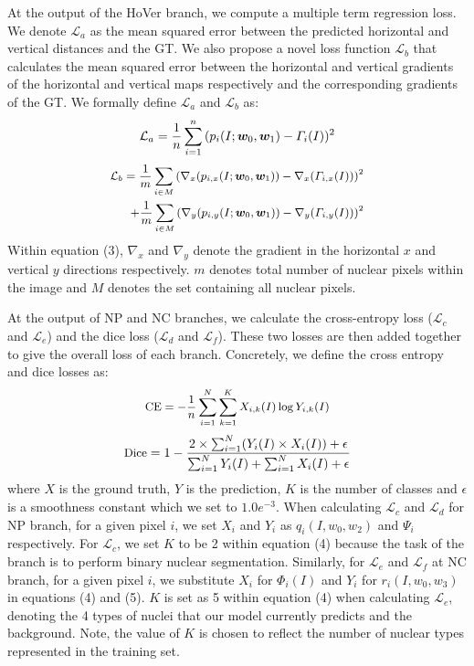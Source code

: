\documentclass[journal]{IEEEtran}
\begin{document}
	At the output of the HoVer branch, we compute a multiple term regression loss. We denote $\mathcal{L}_a$ as the mean squared error between the predicted horizontal and vertical distances and the GT. We also propose a novel loss function $\mathcal{L}_b$ that calculates the mean squared error between the horizontal and vertical gradients of the horizontal and vertical maps respectively and the corresponding gradients of the GT. We formally define $\mathcal{L}_a$ and $\mathcal{L}_b$ as:
	\begin{equation}
	\small
	\mathcal{L}_a = \frac{1}{n}\sum_{i = 1}^n{(p_i(I;\mathbold{w}_0,\mathbold{w}_1)- \Gamma _i(I))^2} 
	\end{equation}
	\begin{equation}
	\small
	\begin{split}
	\mathcal{L}_b =
	\frac{1}{m}\sum_{i \in M}{(\nabla_x(p_{i,x}(I;\mathbold{w}_0,\mathbold{w}_1))-\nabla_x( \Gamma _{i,x}(I)))^2} 
	\\ +
	\frac{1}{m}\sum_{i \in M}{(\nabla_y(p_{i,y}(I;\mathbold{w}_0, \mathbold{w}_1))-\nabla_y( \Gamma _{i,y}(I)))^2}
	\end{split}
	\end{equation}
	\noindent Within equation (3), $\nabla_x$ and $\nabla_y$ denote the gradient in the horizontal $x$ and vertical $y$ directions respectively. $m$ denotes total number of nuclear pixels within the image and $M$ denotes the set containing all nuclear pixels.
	
	At the output of NP and NC branches, we calculate the cross-entropy loss ($\mathcal{L}_{c}$ and $\mathcal{L}_{e}$) and the dice loss ($\mathcal{L}_{d}$ and $\mathcal{L}_{f}$). These two losses are then added together to give the overall loss of each branch. Concretely, we define the cross entropy and dice losses as:
	\begin{equation}
	\small
	\begin{split}
	\text{CE} = -\frac{1}{n}\sum_{i=1}^N
	    \sum_{k=1}^K
	    X_{i,k}(I)\log Y_{i,k}(I)
	\end{split}
	\end{equation}
	\begin{equation}
	\small
	\text{Dice} = 1- \frac{2 \times  \sum_{i=1}^N (Y_i(I) \times X_i(I))+ \epsilon}{\sum_{i=1}^N{Y_i(I) +\sum_{i=1}^N X _i(I)} + \epsilon}
	\end{equation}
	\noindent where $X$ is the ground truth, $Y$ is the prediction, $K$ is the number of classes and $\epsilon$ is a smoothness constant which we set to $1.0e^{-3}$. When calculating $\mathcal{L}_{c}$ and $\mathcal{L}_{d}$ for NP branch, for a given pixel $i$, we set $X_i$ and $Y_i$ as $q_i(I, w_0, w_2)$ and $\Psi_i$ respectively. For $\mathcal{L}_{c}$, we set $K$ to be 2 within equation (4) because the task of the branch is to perform binary nuclear segmentation. Similarly, for $\mathcal{L}_{e}$ and $\mathcal{L}_{f}$ at NC branch, for a given pixel $i$, we substitute $X_i$ for $\Phi_i(I)$ and $Y_i$ for $r_i(I, w_0, w_3)$ in equations (4) and (5). $K$ is set as 5 within equation (4) when calculating $\mathcal{L}_{e}$, denoting the 4 types of nuclei that our model currently predicts and the background. Note, the value of $K$ is chosen to reflect the number of nuclear types represented in the training set. 
	
\end{document}
